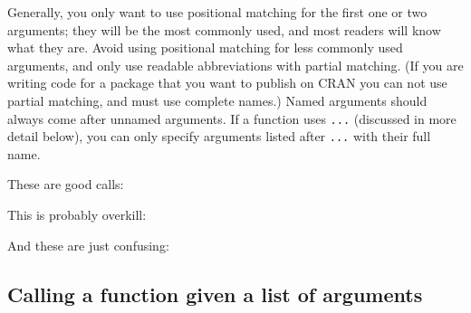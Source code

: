 Generally, you only want to use positional matching for the first one or
two arguments; they will be the most commonly used, and most readers
will know what they are. Avoid using positional matching for less
commonly used arguments, and only use readable abbreviations with
partial matching. (If you are writing code for a package that you want
to publish on CRAN you can not use partial matching, and must use
complete names.) Named arguments should always come after unnamed
arguments. If a function uses \texttt{...} (discussed in more detail
below), you can only specify arguments listed after \texttt{...} with
their full name.

These are good calls:

\begin{Shaded}
\begin{Highlighting}[]
\NormalTok{(}\NormalTok{:}\NormalTok{)}
\NormalTok{(}\NormalTok{:}\NormalTok{, } \NormalTok{)}
\end{Highlighting}
\end{Shaded}

This is probably overkill:

\begin{Shaded}
\begin{Highlighting}[]
\NormalTok{(} \NormalTok{:}\NormalTok{)}
\end{Highlighting}
\end{Shaded}

And these are just confusing:

\begin{Shaded}
\begin{Highlighting}[]
\NormalTok{(}\NormalTok{:}\NormalTok{, } 
\NormalTok{(}\NormalTok{:}\NormalTok{, , }\NormalTok{)}
\NormalTok{(}\NormalTok{:}\NormalTok{, }\NormalTok{)}
\NormalTok{(, }\NormalTok{, } \NormalTok{(}\NormalTok{:}\NormalTok{, }\NormalTok{))}
\end{Highlighting}
\end{Shaded}

\subsection{Calling a function given a list of arguments}

